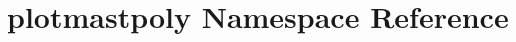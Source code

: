 \hypertarget{namespaceplotmastpoly}{\section{plotmastpoly Namespace Reference}
\label{namespaceplotmastpoly}
}
